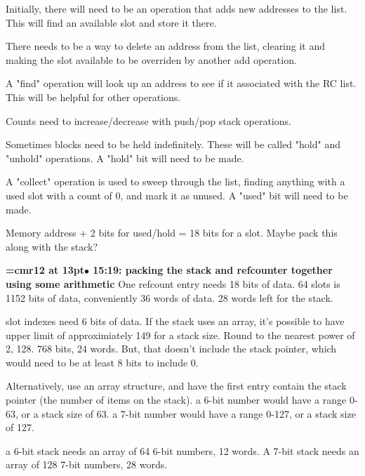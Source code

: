 Initially, there will need to be an operation that adds new addresses to the list. This will find an available slot and store it there.
\par

There needs to be a way to delete an address from the list, clearing it and making the slot available to be overriden by another add operation.
\par

A "find" operation will look up an address to see if it associated with the RC list. This will be helpful for other operations.
\par

Counts need to increase/decrease with push/pop stack operations.
\par

Sometimes blocks need to be held indefinitely. These will be called "hold" and "unhold" operations. A "hold" bit will need to be made.
\par

A "collect" operation is used to sweep through the list, finding anything with a used slot with a count of 0, and mark it as unused. A "used" bit will need to be made.
\par

Memory address + 2 bits for used/hold = 18 bits for a slot. Maybe pack this along with the stack?
\par

{\smallskip\noindent\bf\font\titlefont=cmr12 at 13pt\titlefont $\bullet$ 15:19: packing the stack and refcounter together using some arithmetic}\smallskip
One refcount entry needs 18 bits of data. 64 slots is 1152 bits of data, conveniently 36 words of data. 28 words left for the stack.
\par

slot indexes need 6 bits of data. If the stack uses an array, it's possible to have upper limit of approximiately 149 for a stack size. Round to the nearest power of 2, 128. 768 bits, 24 words. But, that doesn't include the stack pointer, which would need to be at least 8 bits to include 0.
\par

Alternatively, use an array structure, and have the first entry contain the stack pointer (the number of items on the stack). a 6-bit number would have a range 0-63, or a stack size of 63. a 7-bit number would have a range 0-127, or a stack size of 127.
\par

a 6-bit stack needs an array of 64 6-bit numbers, 12 words. A 7-bit stack needs an array of 128 7-bit numbers, 28 words.
\par

